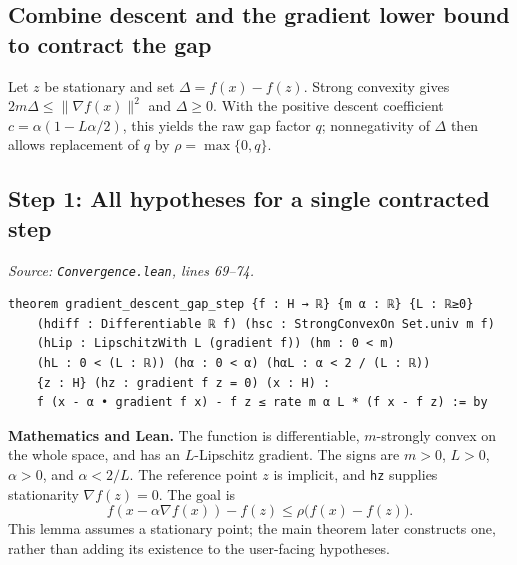 \documentclass[11pt,a4paper]{article}
\newcommand{\norm}[1]{\lVert #1\rVert}
\newcommand{\lean}[1]{\ifmmode\text{\nolinkurl{#1}}\else\nolinkurl{#1}\fi}
\newenvironment{proofstep}{%
 \begin{lrbox}{\proofstepbox}\begin{minipage}{\linewidth}%
}{%
 \end{minipage}\end{lrbox}%
 \par\Needspace{\dimexpr\ht\proofstepbox+\dp\proofstepbox+8pt\relax}%
 \noindent\usebox{\proofstepbox}\par\medskip%
}
\begin{document}
\begin{proofstep}

\section{Combine descent and the gradient lower bound to contract the gap}

Let $z$ be stationary and set $\Delta=f(x)-f(z)$. Strong convexity gives $2m\Delta\le\norm{\nabla f(x)}^2$ and $\Delta\ge0$. With the positive descent coefficient $c=\alpha(1-L\alpha/2)$, this yields the raw gap factor $q$; nonnegativity of $\Delta$ then allows replacement of $q$ by $\rho=\max\{0,q\}$.

\subsection*{Step 1: All hypotheses for a single contracted step}

\textit{Source: \lean{Convergence.lean}, lines 69--74.}
\begin{lstlisting}[style=leanproof,firstnumber=69]
theorem gradient_descent_gap_step {f : H → ℝ} {m α : ℝ} {L : ℝ≥0}
    (hdiff : Differentiable ℝ f) (hsc : StrongConvexOn Set.univ m f)
    (hLip : LipschitzWith L (gradient f)) (hm : 0 < m)
    (hL : 0 < (L : ℝ)) (hα : 0 < α) (hαL : α < 2 / (L : ℝ))
    {z : H} (hz : gradient f z = 0) (x : H) :
    f (x - α • gradient f x) - f z ≤ rate m α L * (f x - f z) := by
\end{lstlisting}


\textbf{Mathematics and Lean.} The function is differentiable, $m$-strongly convex on the whole space, and has an $L$-Lipschitz gradient. The signs are $m>0$, $L>0$, $\alpha>0$, and $\alpha<2/L$. The reference point $z$ is implicit, and \lean{hz} supplies stationarity $\nabla f(z)=0$. The goal is
\[
f(x-\alpha\nabla f(x))-f(z)\le\rho\bigl(f(x)-f(z)\bigr).
\]
This lemma assumes a stationary point; the main theorem later constructs one, rather than adding its existence to the user-facing hypotheses.

\end{proofstep}
\end{document}
